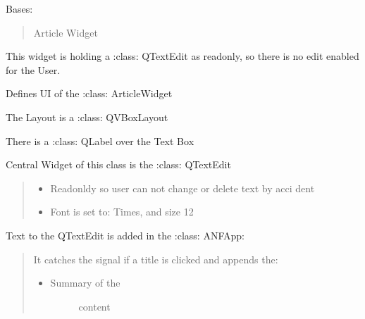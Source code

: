 \documentclass[letterpaper,10pt,english]{sphinxmanual}
\begin{document}
\begin{fulllineitems}
\label{\detokenize{anfrss.gui:anfrss.gui.guiapp.ArticleWidget}}
Bases: 
\begin{quote}

Article Widget
\end{quote}

This widget is holding a
:class: QTextEdit
as read\sphinxhyphen{}only, so there is
no edit enabled for the User.

\begin{fulllineitems}
\label{\detokenize{anfrss.gui:anfrss.gui.guiapp.ArticleWidget.initUi}}
Defines UI of the
:class: ArticleWidget

The Layout is a
:class: QVBoxLayout

There is a
:class: QLabel over
the Text Box

Central Widget of this
class is the
:class: QTextEdit
\begin{quote}
\begin{itemize}
\item {} 
Read\sphinxhyphen{}onldy so user
can not change or
delete text by acci\sphinxhyphen{}
dent

\end{itemize}
\begin{itemize}
\item {} 
Font is set to:
Times, and size 12

\end{itemize}
\end{quote}

Text to the QTextEdit is
added in the
:class: ANFApp:
\begin{quote}

It catches the signal
if a title is clicked
and appends the:
\begin{itemize}
\item {} \begin{description}
\item[{Summary of the}] \leavevmode
content

\end{description}


\end{itemize}
\end{quote}
\end{fulllineitems}
\end{fulllineitems}
\end{document}
